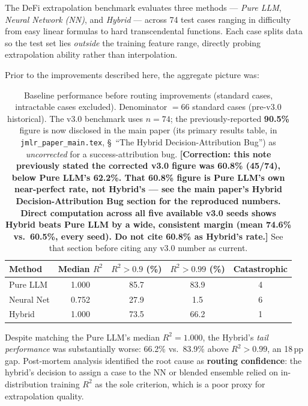 \documentclass[twoside,11pt]{article}
\begin{document}
The DeFi extrapolation benchmark evaluates three methods --- \emph{Pure LLM},
\emph{Neural Network (NN)}, and \emph{Hybrid} --- across 74 test cases ranging
in difficulty from easy linear formulas to hard transcendental functions.
Each case splits data so the test set lies \emph{outside} the training feature
range, directly probing extrapolation ability rather than interpolation.

Prior to the improvements described here, the aggregate picture was:

\begin{table}[h]
\centering
\caption{Baseline performance before routing improvements (standard cases,
         intractable cases excluded). Denominator $= 66$ standard cases
         (pre-v3.0 historical). The v3.0 benchmark uses $n=74$; the
         previously-reported \textbf{90.5\%} figure is now disclosed in the
         main paper (its primary results table, in
         \texttt{jmlr\_paper\_main.tex}, \S~``The Hybrid
         Decision-Attribution Bug'') as \emph{uncorrected} for a
         success-attribution bug.
         \textbf{[Correction: this note previously stated the corrected v3.0
         figure was 60.8\% (45/74), below Pure LLM's 62.2\%. That 60.8\%
         figure is Pure LLM's own near-perfect rate, not Hybrid's --- see
         the main paper's Hybrid Decision-Attribution Bug section for the
         reproduced numbers. Direct computation across all five available
         v3.0 seeds shows Hybrid beats Pure LLM by a wide, consistent
         margin (mean 74.6\% vs.\ 60.5\%, every seed). Do not cite 60.8\%
         as Hybrid's rate.]} See that section before citing any v3.0
         number as current.}
\label{tab:baseline}
\begin{tabular}{lcccc}
\toprule
Method & Median $R^2$ & $R^2 > 0.9$ (\%) & $R^2 > 0.99$ (\%) & Catastrophic \\
\midrule
Pure LLM    & 1.000 & 85.7 & 83.9 & 4 \\
Neural Net  & 0.752 & 27.9 &  1.5 & 6 \\
Hybrid      & 1.000 & 73.5 & 66.2 & 1 \\
\bottomrule
\end{tabular}
\end{table}

Despite matching the Pure LLM's median $R^2 = 1.000$, the Hybrid's
\emph{tail performance} was substantially worse: 66.2\% vs.\ 83.9\% above
$R^2 > 0.99$, an 18\,pp gap.  Post-mortem analysis identified the root cause
as \textbf{routing confidence}: the hybrid's decision to assign a case to the
NN or blended ensemble relied on in-distribution training $R^2$ as the sole
criterion, which is a poor proxy for extrapolation quality.
\end{document}
